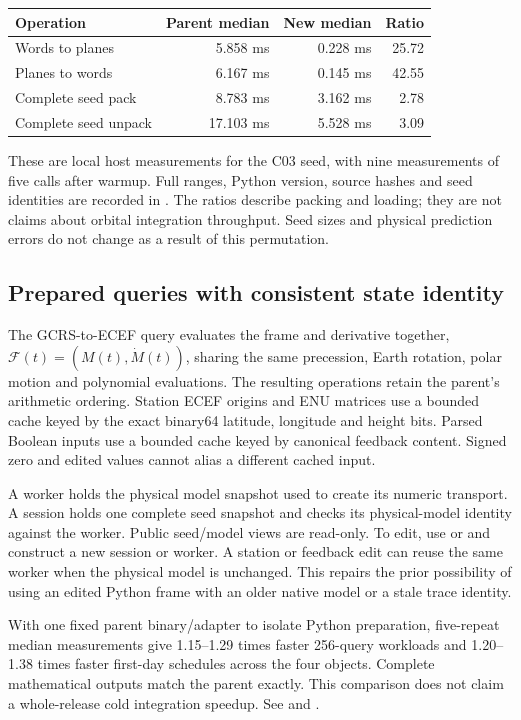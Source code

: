 \begin{center}
\begin{tabular}{lrrr}\toprule
Operation & Parent median & New median & Ratio\\\midrule
Words to planes & 5.858 ms & 0.228 ms & 25.72\\
Planes to words & 6.167 ms & 0.145 ms & 42.55\\
Complete seed pack & 8.783 ms & 3.162 ms & 2.78\\
Complete seed unpack & 17.103 ms & 5.528 ms & 3.09\\\bottomrule
\end{tabular}
\end{center}
These are local host measurements for the C03 seed, with nine measurements of
five calls after warmup. Full ranges, Python version, source hashes and seed
identities are recorded in
. The ratios describe
packing and loading; they are not claims about orbital integration throughput.
Seed sizes and physical prediction errors do not change as a result of this
permutation.

\subsection{Prepared queries with consistent state identity}
The GCRS-to-ECEF query evaluates the frame and derivative together,
$\mathcal F(t)=(M(t),\dot M(t))$, sharing the same precession, Earth rotation,
polar motion and polynomial evaluations. The resulting operations retain the
parent's arithmetic ordering. Station ECEF origins and ENU matrices use a bounded
cache keyed by the exact binary64 latitude, longitude and height bits. Parsed
Boolean inputs use a bounded cache keyed by canonical feedback content. Signed
zero and edited values cannot alias a different cached input.

A worker holds the physical model snapshot used to create its numeric transport.
A session holds one complete seed snapshot and checks its physical-model identity
against the worker. Public seed/model views are read-only. To edit, use
 or  and construct a new
session or worker. A station or feedback edit can reuse the same worker when the
physical model is unchanged. This repairs the prior possibility of using an
edited Python frame with an older native model or a stale trace identity.

With one fixed parent binary/adapter to isolate Python preparation, five-repeat
median measurements give 1.15--1.29 times faster 256-query workloads and
1.20--1.38 times faster first-day schedules across the four objects. Complete
mathematical outputs match the parent exactly. This comparison does not claim a
whole-release cold integration speedup. See
 and
.

